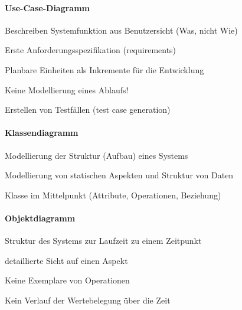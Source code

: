 \documentclass[a4paper]{article}
\begin{document}
\begin{multicols}{3}
  \paragraph{Use-Case-Diagramm}
  \begin{itemize*}
    \item Beschreiben Systemfunktion aus Benutzersicht (Was, nicht Wie)
    \item Erste Anforderungsspezifikation (requirements)
    \item Planbare Einheiten als Inkremente für die Entwicklung
    \item Keine Modellierung eines Ablaufs!
    \item Erstellen von Testfällen (test case generation)
  \end{itemize*}

  \paragraph{Klassendiagramm}
  \begin{itemize*}
    \item Modellierung der Struktur (Aufbau) eines Systems
    \item Modellierung von statischen Aspekten und Struktur von Daten
    \item Klasse im Mittelpunkt (Attribute, Operationen, Beziehung)
  \end{itemize*}

  \paragraph{Objektdiagramm}
  \begin{itemize*}
    \item Struktur des Systems zur Laufzeit zu einem Zeitpunkt
    \item detaillierte Sicht auf einen Aspekt
    \item Keine Exemplare von Operationen
    \item Kein Verlauf der Wertebelegung über die Zeit
  \end{itemize*}


\end{multicols}
\end{document}
